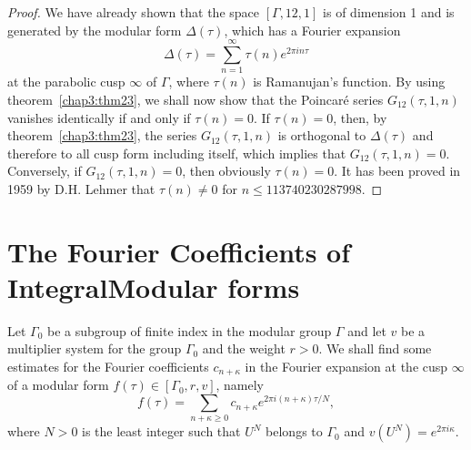\begin{proof}
We have already shown that the space $[\Gamma, 12, 1]$ is of dimension
1 and is generated by the modular form $\Delta(\tau)$, which has a
Fourier expansion 
$$
\Delta(\tau) =\sum^{\infty}_{n=1} \tau(n) e^{2\pi in\tau}
$$
at the parabolic cusp $\infty$ of $\Gamma$, where $\tau(n)$ is
Ramanujan's function. By using theorem~\ref{chap3:thm23}, we shall now show that the
Poincar\'e series $G_{12}(\tau,1,n)$ vanishes identically if and only
if $\tau(n)=0$. If $\tau(n)=0$, then, by theorem~\ref{chap3:thm23}, the series
$G_{12}(\tau, 1, n)$ is orthogonal to $\Delta(\tau)$ and therefore to
all cusp form including itself, which implies that
$G_{12}(\tau,1,n)=0$. Conversely, if $G_{12}(\tau,1,n)=0$, then
obviously $\tau(n)=0$. It has been proved in 1959 by D.H. Lehmer that
$\tau(n)\neq 0$ for $n \leq 113740230287998$.
\end{proof}

\section[The Fourier Coefficients of...]{The Fourier Coefficients of Integral\hfill\break Modular forms}\label{chap3:sec4}
Let $\Gamma_0$ be a subgroup of finite index in the modular group
$\Gamma$ and let $v$ be a multiplier system for the group $\Gamma_0$
and the weight $r>0$. We shall find some estimates for the Fourier
coefficients $c_{n+\kappa}$ in the Fourier \pageoriginale expansion at
the cusp $\infty$ of a modular form $f(\tau)\in [\Gamma_0, r,
  v]$, namely
\begin{equation*}
f(\tau) = \sum_{n+\kappa \geq 0} c_{n+\kappa} e^{2\pi
  i(n+\kappa)\tau/N}, \tag{1}\label{c3:eq4:1}
\end{equation*}
where $N>0$ is the least integer such that $U^N$ belongs to $\Gamma_0$
and $v(U^{N}) =e^{2\pi i \kappa}$.

